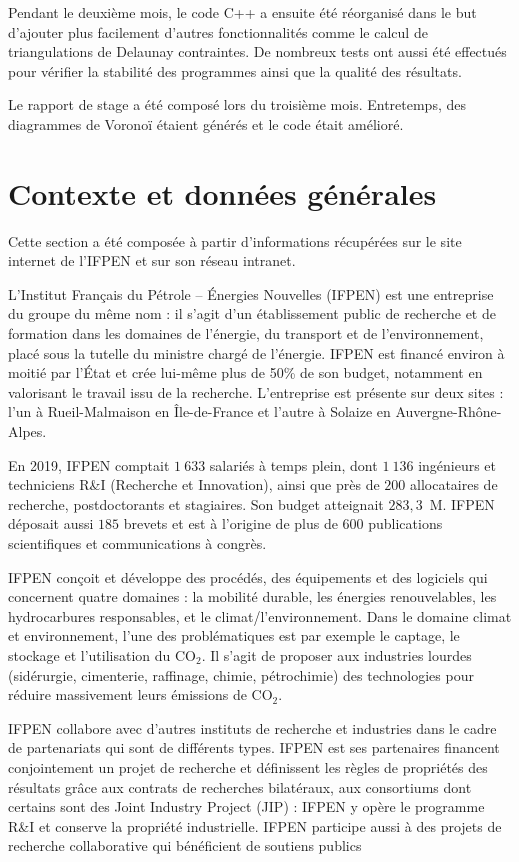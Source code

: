 \documentclass[12pt,a4paper]{report}
\begin{document}
Pendant le deuxième mois, le code C++ a ensuite été réorganisé dans le but d'ajouter plus facilement d'autres fonctionnalités comme le calcul de triangulations de Delaunay contraintes. De nombreux tests ont aussi été effectués pour vérifier la stabilité des programmes ainsi que la qualité des résultats.

Le rapport de stage a été composé lors du troisième mois. Entretemps, des diagrammes de Voronoï étaient générés et le code était amélioré.

\newpage
\section{Contexte et données générales}
Cette section a été composée à partir d'informations récupérées sur le site internet de l'IFPEN et sur son réseau intranet.

L'Institut Français du Pétrole -- \'Energies Nouvelles (IFPEN) est une entreprise du groupe du même nom : il s'agit d'un établissement public de recherche et de formation dans les domaines de l'énergie, du transport et de l'environnement, placé sous la tutelle du ministre chargé de l'énergie. IFPEN est financé environ à moitié par l'\'Etat et crée lui-même plus de 50\% de son budget, notamment en valorisant le travail issu de la recherche. L'entreprise est présente sur deux sites : l'un à Rueil-Malmaison en \^Ile-de-France et l'autre à Solaize en Auvergne-Rhône-Alpes.

En 2019, IFPEN comptait $1\ 633$ salariés à temps plein, dont $1\ 136$ ingénieurs et techniciens R\&I (Recherche et Innovation), ainsi que près de $200$ allocataires de recherche, postdoctorants et stagiaires. Son budget atteignait $283,3$~\textrm{M}\texteuro. IFPEN déposait aussi $185$ brevets et est à l'origine de plus de $600$ publications scientifiques et communications à congrès.

IFPEN conçoit et développe des procédés, des équipements et des logiciels qui concernent quatre domaines : la mobilité durable, les énergies renouvelables, les hydrocarbures responsables, et le climat/l'environnement. Dans le domaine climat et environnement, l'une des problématiques est par exemple le captage, le stockage et l'utilisation du CO$_2$. Il s'agit de proposer aux industries lourdes (sidérurgie, cimenterie, raffinage, chimie, pétrochimie) des technologies pour réduire massivement leurs émissions de CO$_2$.

IFPEN collabore avec d'autres instituts de recherche et industries dans le cadre de partenariats qui sont de différents types. IFPEN est ses partenaires financent conjointement un projet de recherche et définissent les règles de propriétés des résultats grâce aux contrats de recherches bilatéraux, aux consortiums dont certains sont des Joint Industry Project (JIP) : IFPEN y opère le programme R\&I et conserve la propriété industrielle. IFPEN participe aussi à des projets de recherche collaborative qui bénéficient de soutiens publics
\end{document}

